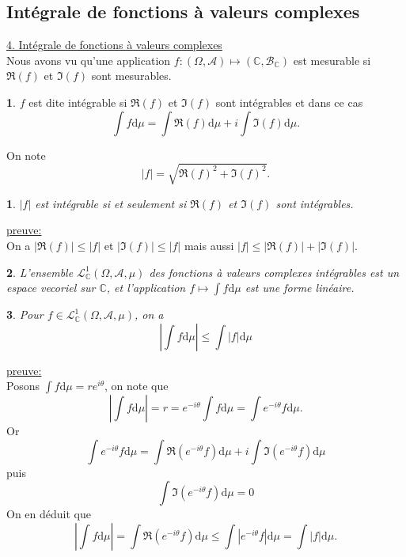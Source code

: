 \documentclass[8pt,notheorems]{beamer}
\newtheorem{prop}{\translate{Proposition}}
\theoremstyle{definition}
\newtheorem{definition}{\translate{Definition}}
\theoremstyle{example}
\theoremstyle{mystyle}
\theoremstyle{plain}
\begin{document}
\subsection{Intégrale de fonctions à valeurs complexes}
\begin{frame}[allowframebreaks]
\underline{4. Intégrale de fonctions à valeurs complexes}\\
Nous avons vu qu'une application $f:(\Omega,\mathcal{A})\mapsto (\mathbb{C},\mathcal{B}_\mathbb{C})$ est mesurable si $\Re(f)$ et $\Im(f)$ sont mesurables. 
\begin{definition}
$f$ est dite intégrable si $\Re(f)$ et $\Im(f)$ sont intégrables et dans ce cas
$$
\int f \text{d}\mu = \int\Re(f)\text{d}\mu+i\int \Im(f)\text{d}\mu.
$$
\end{definition}

On note 
$$
|f| = \sqrt{\Re(f)^2+\Im(f)^2}.
$$

\begin{prop}
$|f|$ est intégrable si et seulement si $\Re(f)$ et $\Im(f)$ sont intégrables. 
\end{prop}
\underline{preuve:}\\
On a $|\Re(f)|\leq |f|$ et $|\Im(f)|\leq |f|$ mais aussi $|f|\leq |\Re(f)|+|\Im(f)|$. 

\begin{prop}
L'ensemble $\mathcal{L}_{\mathbb{C}}^{1}(\Omega, \mathcal{A},\mu)$ des fonctions à valeurs complexes intégrables est un espace vecoriel sur $\mathbb{C}$, et l'application $f\mapsto\int f\text{d}\mu$ est une forme linéaire.
\end{prop}
\begin{prop}
Pour $f\in \mathcal{L}_{\mathbb{C}}^{1}(\Omega, \mathcal{A},\mu)$, on a 
$$
\left|\int f\text{d}\mu\right|\leq \int |f|\text{d}\mu
$$
\end{prop}
\underline{preuve:}\\
Posons $\int f\text{d}\mu = re^{i\theta}$, on note que 
$$
\left|\int f\text{d}\mu\right| = r =e^{-i\theta}\int f\text{d}\mu = \int e^{-i\theta}f\text{d}\mu.
$$
Or 
$$
\int e^{-i\theta}f\text{d}\mu = \int \Re\left(e^{-i\theta}f\right)\text{d}\mu + i \int \Im\left(e^{-i\theta}f\right)\text{d}\mu
$$
puis 
$$
\int \Im\left(e^{-i\theta}f\right)\text{d}\mu = 0
$$
On en déduit que 
$$
\left|\int f\text{d}\mu\right| = \int \Re\left(e^{-i\theta}f\right)\text{d}\mu \leq \int \left|e^{-i\theta}f\right|\text{d}\mu = \int|f|\text{d}\mu.
$$
\end{frame}
\end{document}
